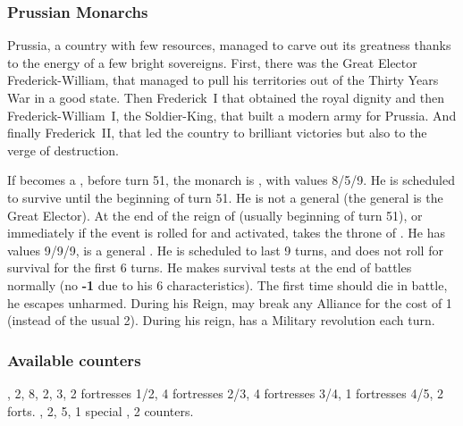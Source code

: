 \subsubsection{Prussian Monarchs}
\begin{histoire}
  Prussia, a country with few resources, managed to carve out its
  greatness thanks to the energy of a few bright sovereigns. First,
  there was the Great Elector Frederick-William, that managed to pull
  his territories out of the Thirty Years War in a good state. Then
  Frederick~I that obtained the royal dignity and then
  Frederick-William~I, the Soldier-King, that built a modern army for
  Prussia. And finally Frederick~II, that led the country to brilliant
  victories but also to the verge of destruction.
\end{histoire}
 If \PRU becomes a \MAJ,
before turn 51, the monarch is , with values
8/5/9. He is scheduled to survive until the beginning of turn 51. He is
not a general (the  general is the Great
Elector).
 At the end of the reign of
 (usually beginning of turn 51), or
immediately if the event  is rolled for
and activated,  takes the throne of
. He has values 9/9/9, is a general
. He is scheduled to last 9 turns, and does
not roll for survival for the first 6 turns.
\bparag He makes survival tests at the end of battles normally (no {\bf
  -1} due to his 6 characteristics).
 The first time 
should die in battle, he escapes unharmed.
\bparag During his Reign,  may break any Alliance for
the cost of 1 \STAB (instead of the usual 2).
\bparag During his reign, \PRU has a Military revolution each turn.

\subsubsection{Available counters}
\ARMY, 2\LDND, 8\LD, 2\NTD, 3\LDENDE, 2
fortresses 1/2, 4 fortresses 2/3, 4 fortresses 3/4, 1 fortresses 4/5, 2
forts.
\COL, 2\TP, 5\MNU, 1 special \MNU, 2\TradeFLEET
counters.


